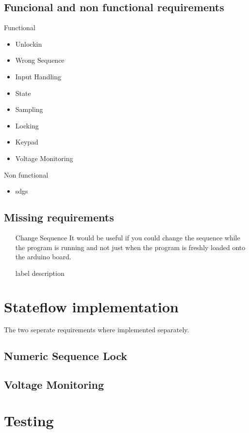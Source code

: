 	
	\subsection{Funcional and non functional requirements}
	Functional	
		\begin{itemize}
			\item Unlockin
			\item Wrong Sequence
			\item Input Handling
			\item State
			\item Sampling
			\item Locking
			\item Keypad
			\item Voltage Monitoring
		\end{itemize}
	Non functional
		\begin{itemize}
			\item sdgs
		\end{itemize}

	\subsection{Missing requirements}
	
		\begin{itemize}
			\item[Change Sequence] It would be useful if you could change the sequence while the program is running and not just when the program is freshly loaded onto the arduino board.
			\item[label] description
		\end{itemize}


\section{Stateflow implementation}
The two seperate requirements where implemented separately.

	\subsection{Numeric Sequence Lock}
	
	
	\subsection{Voltage Monitoring}


\section{Testing}


